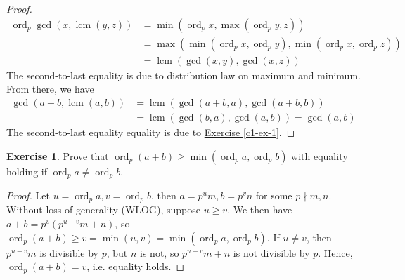 \documentclass{article}
\theoremstyle{definition}
\newtheorem{exercise}{Exercise}
\begin{document}
\begin{proof}
\begin{align*}
\operatorname{ord}_p \gcd(x, \operatorname{lcm}(y, z)) & = \min(\operatorname{ord}_p x, \max(\operatorname{ord}_p y, z)) \\
& = \max(\min(\operatorname{ord}_p x, \operatorname{ord}_p y), \min(\operatorname{ord}_p x, \operatorname{ord}_p z)) \\
& = \operatorname{lcm} (\gcd(x, y), \gcd(x, z))
\end{align*}
The second-to-last equality is due to distribution law on maximum and minimum. From there, we have
\begin{align*}
\gcd(a + b, \operatorname{lcm}(a, b)) & = \operatorname{lcm}(\gcd(a + b, a), \gcd(a + b, b)) \\
& = \operatorname{lcm}(\gcd(b, a), \gcd(a, b)) = \gcd(a, b)
\end{align*}
The second-to-last equality equality is due to \hyperref[c1-ex-1]{Exercise \ref*{c1-ex-1}}.
\end{proof}

\newpage

\begin{exercise}
Prove that $\operatorname{ord}_p (a + b) \geq \min(\operatorname{ord}_p a, \operatorname{ord}_p b)$ with equality holding if $\operatorname{ord}_p a \neq \operatorname{ord}_p b$.
\end{exercise}
\begin{proof}
Let $u = \operatorname{ord}_p a, v = \operatorname{ord}_p b$, then $a = p^u m, b = p^v n$ for some $p \nmid m, n$. Without loss of generality (WLOG), suppose $u \geq v$. We then have $a + b = p^v (p^{u - v} m + n)$, so $\operatorname{ord}_p (a + b) \geq v = \min(u, v) = \min(\operatorname{ord}_p a, \operatorname{ord}_p b)$. If $u \neq v$, then $p^{u - v} m$ is divisible by $p$, but $n$ is not, so $p^{u - v} m + n$ is not divisible by $p$. Hence, $\operatorname{ord}_p (a + b) = v$, i.e. equality holds.
\end{proof}

\newpage
\end{document}
